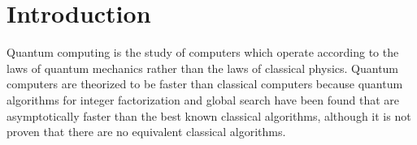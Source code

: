 \chapter{Introduction}
Quantum computing is the study of computers which operate according to the laws of quantum mechanics rather than the laws of classical physics.  Quantum computers are theorized to be faster than classical computers because quantum algorithms for integer factorization\cite{shor} and global search\cite{grover} have been found that are asymptotically faster than the best known classical algorithms, although it is not proven that there are no equivalent classical algorithms.


